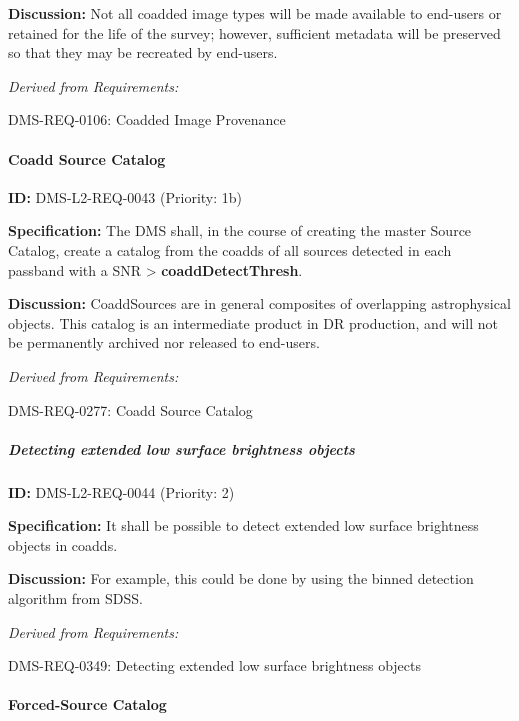 \documentclass[SE,toc,lsstdraft]{lsstdoc}
\begin{document}
\textbf{Discussion:} Not all coadded image types will be made available to end-users or retained for the life of the survey; however, sufficient metadata will be preserved so that they may be recreated by end-users.

\emph{Derived from Requirements:}

DMS-REQ-0106:
Coadded Image Provenance \newline

\paragraph{Coadd Source Catalog}\hfill  %

\label{DMS-L2-REQ-0043}
\textbf{ID:} DMS-L2-REQ-0043 (Priority: 1b)

\textbf{Specification:} The DMS shall, in the course of creating the master Source Catalog, create a catalog from the coadds of all sources detected in each passband with a SNR > \textbf{coaddDetectThresh}.

\textbf{Discussion: }CoaddSources are in general composites of overlapping astrophysical objects. This catalog is an intermediate product in DR production, and will not be permanently archived nor released to end-users.

\emph{Derived from Requirements:}

DMS-REQ-0277:
Coadd Source Catalog \newline

\subparagraph{Detecting extended  low surface brightness objects}\hfill  %

\label{DMS-L2-REQ-0044}
\textbf{ID:} DMS-L2-REQ-0044 (Priority: 2)

\textbf{Specification: }It shall be possible to detect extended low surface brightness objects in coadds.

\textbf{Discussion: }For example, this could be done by using the binned detection algorithm from SDSS.

\emph{Derived from Requirements:}

DMS-REQ-0349:
Detecting extended  low surface brightness objects \newline

\paragraph{Forced-Source Catalog}\hfill  %
\end{document}
